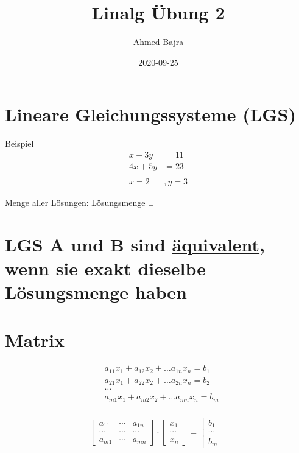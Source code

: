 \documentclass{article}
\title{Linalg Übung 2}
\author{Ahmed Bajra}
\date{2020-09-25}
\begin{document}
    \maketitle

    \section{Lineare Gleichungssysteme (LGS)}
    Beispiel
    \begin{align*}
        x + 3y &= 11 \\
        4x + 5y &= 23 \\\\
        x = 2&, y = 3
    \end{align*}
    
    Menge aller Lösungen: Lösungsmenge $\mathbb{L}$

    \section{LGS A und B sind \underline{äquivalent}, wenn sie exakt dieselbe Lösungsmenge haben}

    \section{Matrix}

    \begin{align*}
        &a_{11}x_1 + a_{12}x_2 + \dots a_{1n}x_n = b_1 \\ 
        &a_{21}x_1 + a_{22}x_2 + \dots a_{2n}x_n = b_2 \\
        &\dots \\ 
        &a_{m1}x_1 + a_{m2}x_2 + \dots a_{mn}x_n = b_m \\ 
    \end{align*}

    \begin{align*}
        \begin{bmatrix}
            a_{11} & \dotsb & a_{1n} \\
            \dotsb&\dotsb&\dotsb \\
            a_{m1} & \dotsb & a_{mn}
        \end{bmatrix} 
        \cdot
        \begin{bmatrix}
            x_1 \\ 
            \dotsb \\ 
            x_n
        \end{bmatrix} 
        = 
        \begin{bmatrix}
            b_1 \\
            \dotsb \\
            b_m
        \end{bmatrix}
    \end{align*}
\end{document}
